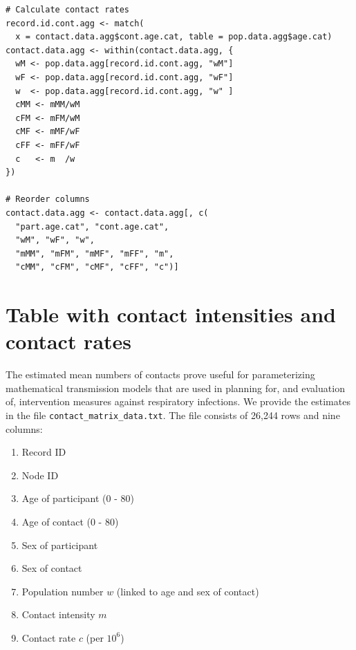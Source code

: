 \documentclass[aoas,preprint]{imsart}
\numberwithin{equation}{section}
\begin{document}
\begin{verbatim}
# Calculate contact rates
record.id.cont.agg <- match(
  x = contact.data.agg$cont.age.cat, table = pop.data.agg$age.cat)
contact.data.agg <- within(contact.data.agg, {
  wM <- pop.data.agg[record.id.cont.agg, "wM"]
  wF <- pop.data.agg[record.id.cont.agg, "wF"]
  w  <- pop.data.agg[record.id.cont.agg, "w" ]
  cMM <- mMM/wM
  cFM <- mFM/wM
  cMF <- mMF/wF
  cFF <- mFF/wF
  c   <- m  /w
})

# Reorder columns
contact.data.agg <- contact.data.agg[, c(
  "part.age.cat", "cont.age.cat",
  "wM", "wF", "w",
  "mMM", "mFM", "mMF", "mFF", "m",
  "cMM", "cFM", "cMF", "cFF", "c")]
\end{verbatim}

\section{Table with contact intensities and contact rates}

The estimated mean numbers of contacts prove useful for parameterizing mathematical transmission models that are used in planning for, and evaluation of, intervention measures against respiratory infections. We provide the estimates in the file \texttt{contact\_matrix\_data.txt}. The file consists of 26,244 rows and nine columns:
\begin{enumerate}
\item Record ID
\item Node ID
\item Age of participant (0 - 80)
\item Age of contact (0 - 80)
\item Sex of participant
\item Sex of contact
\item Population number $w$ (linked to age and sex of contact)
\item Contact intensity $m$
\item Contact rate $c$ (per $10^6$)
\end{enumerate}
\end{document}
